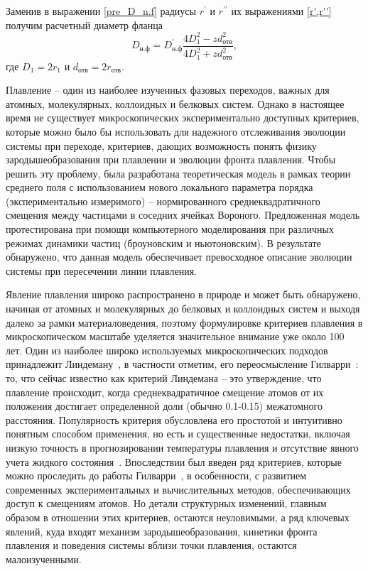 Заменив в выражении \eqref{pre_D_n.f} радиусы $r^{\prime}$ и $r^{\prime \prime}$ их выражениями \eqref{r',r''} получим расчетный диаметр фланца
\begin{equation}
  \label{D_n.f}
  D_{\text{н.ф}} = D_{\text{н.ф}}^{\prime} \frac{4D_{1}^{2} - z d_{\text{отв}}^{2}}{4D_{1}^{2} + z d_{\text{отв}}^{2}},
\end{equation}
где $D_{1}=2r_{1}$ и $d_{\text{отв}}=2r_{\text{отв}}$.


Плавление -- один из наиболее изученных фазовых переходов, важных для атомных, молекулярных, коллоидных и белковых систем.
Однако в настоящее время не существует микроскопических экспериментально доступных критериев, которые можно было бы использовать для надежного отслеживания эволюции системы при переходе, критериев, дающих возможность понять физику зародышеобразования при плавлении и эволюции фронта плавления.
Чтобы решить эту проблему, была разработана теоретическая модель в рамках теории среднего поля с использованием нового локального параметра порядка (экспериментально измеримого) -- нормированного среднеквадратичного смещения между частицами в соседних ячейках Вороного.
Предложенная модель протестирована при помощи компьютерного моделирования при различных режимах динамики частиц (броуновским и ньютоновским).
В результате обнаружено, что данная модель обеспечивает превосходное описание эволюции системы при пересечении линии плавления.

Явление плавления широко распространено в природе и может быть обнаружено, начиная от атомных и молекулярных до белковых и коллоидных систем и выходя далеко за рамки материаловедения, поэтому формулировке критериев плавления в микроскопическом масштабе уделяется значительное внимание уже около 100 лет.
Один из наиболее широко используемых микроскопических подходов принадлежит Линдеману~\cite{lindemann1910}, в частности отметим, его переосмысление Гилварри~\cite{10.1103/physrev.102.308}: то, что сейчас известно как критерий Линдемана -- это утверждение, что плавление происходит, когда среднеквадратичное смещение атомов от их положения достигает определенной доли (обычно 0.1-0.15) межатомного расстояния.
Популярность критерия обусловлена его простотой и интуитивно понятным способом применения, но есть и существенные недостатки, включая низкую точность в прогнозировании температуры плавления и отсутствие явного учета жидкого состояния~\cite{10.1098/rspa.1991.0068}.
Впоследствии был введен ряд критериев, которые можно проследить до работы Гилварри~\cite{10.1063/1.1426419}, в особенности, с развитием современных экспериментальных и вычислительных методов, обеспечивающих доступ к смещениям атомов.
Но детали структурных изменений, главным образом в отношении этих критериев, остаются неуловимыми, а ряд ключевых явлений, куда входят механизм зародышеобразования, кинетики фронта плавления и поведения системы вблизи точки плавления, остаются малоизученными.


